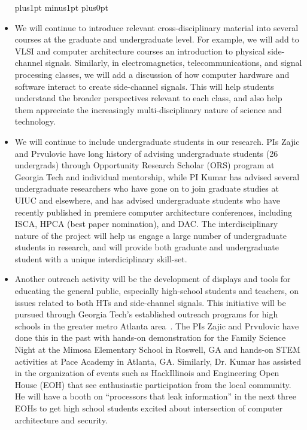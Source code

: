 \documentclass[11 pt]{article}
\def\denseitems{
  \itemsep1pt plus1pt minus1pt
  \parsep0pt plus0pt
  \parskip0pt
  \topsep0pt
}
\begin{document}
\begin{itemize}\denseitems

\item We will continue to introduce relevant cross-disciplinary material into several courses at the graduate and undergraduate level.
For example, we will add to VLSI and computer architecture courses an introduction to physical side-channel signals.
Similarly, in electromagnetics, telecommunications, and signal processing classes, we will add a discussion of how computer
hardware and software interact to create side-channel signals. This will help students understand the broader perspectives relevant to
each class, and also help them appreciate the increasingly multi-disciplinary nature of science and technology.

\item We will continue to include undergraduate students in our research.
PIs Zajic and Prvulovic have long history of advising undergraduate students (26 undergrads)
through Opportunity Research Scholar (ORS) program at Georgia Tech and individual mentorship,
while PI Kumar has advised several undergraduate researchers who have gone on to join graduate
studies at UIUC and elsewhere, and has advised undergraduate students who have recently published
in premiere computer architecture conferences, including ISCA, HPCA (best paper nomination),
and DAC. The interdisciplinary nature of the project will help us engage a large number of undergraduate
students in research, and will provide both graduate and undergraduate student with a unique interdiciplinary skill-set.

\item Another outreach activity will be the development of displays
  and tools for educating the general public, especially high-school
  students and teachers, on issues related to both HTs and side-channel signals. This initiative will be
  pursued through Georgia Tech’s established outreach programs for
  high schools in the greater metro Atlanta area~\cite{Conrad2022}.
  The PIs Zajic and Prvulovic have done this in the past with hands-on demonstration for the Family Science Night at the Mimosa
  Elementary School in Roswell, GA and hands-on STEM activities at Pace Academy in Atlanta, GA.
  Similarly, Dr. Kumar has assisted in the organization of events such as HackIllinois and Engineering Open House (EOH)
  that see enthusiastic participation from the local community. He will have a booth on “processors that leak information” in the
  next three EOHs to get high school students excited about intersection of computer architecture and security.

\end{itemize}
\end{document}
